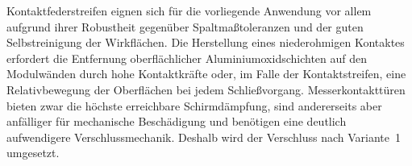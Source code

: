 Kontaktfederstreifen eignen sich für die vorliegende Anwendung vor allem aufgrund ihrer Robustheit gegenüber Spaltmaßtoleranzen und der guten Selbstreinigung der Wirkflächen. Die Herstellung eines niederohmigen Kontaktes erfordert die Entfernung oberflächlicher Aluminiumoxidschichten auf den Modulwänden durch hohe Kontaktkräfte oder, im Falle der Kontaktstreifen, eine Relativbewegung der Oberflächen bei jedem Schließvorgang. Messerkontakttüren bieten zwar die höchste erreichbare Schirmdämpfung, sind andererseits aber anfälliger für mechanische Beschädigung und benötigen eine deutlich aufwendigere Verschlussmechanik. Deshalb wird der Verschluss nach Variante~1 umgesetzt.

